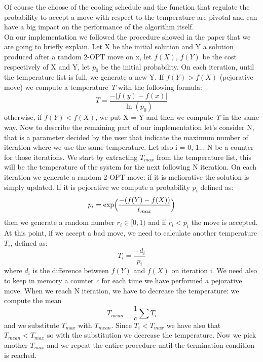 \noindent Of course the choose of the cooling schedule and the function that regulate the probability to accept a move with respect to the temperature are pivotal and can have a big impact on the performance of the algorithm itself. \\
On our implementation we followed the procedure showed in the paper \cite{simAn} that we are going to briefly explain.
Let X be the initial solution and Y a solution produced after a random 2-OPT move on x, let $f(X)$, $f(Y)$ be the cost respectively of X and Y, let $p_0$ be the initial probability. On each iteration, until the temperature list is full, we generate a new Y. If $f(Y) > f(X)$ (pejorative move) we compute a temperature \textit{T} with the following formula:
\begin{equation*}
T = \frac{-\vert f(y) - f(x) \vert}{\ln{(p_0)}}
\end{equation*}
otherwise, if $f(Y) < f(X)$, we put X = Y and then we compute \textit{T} in the same way.
Now to describe the remaining part of our implementation let's consider N, that is a parameter decided by the user that indicate the maximum number of iteration where we use the same temperature. Let also i = 0, 1... N be a counter for those iterations. We start by extracting $T_{max}$ from the temperature list, this will be the temperature of the system for the next following N iteration. On each iteration we generate a random 2-OPT move: if it is meliorative the solution is simply updated. If it is pejorative we compute a probability $p_i$ defined as:
\begin{equation*}
p_i = \exp \Bigl( \frac{-(f(Y)-f(X))}{t_{max}} \Bigr)
\end{equation*}
then we generate a random number $r_i \in [0, 1)$ and if $r_i < p_i$ the move is accepted.
At this point, if we accept a bad move, we need to calculate another temperature $T_i$, defined as:
\begin{equation*}
T_i = \frac{-d_i}{p_i}
\end{equation*} 
where $d_i$ is the difference between $f(Y)$ and $f(X)$ on iteration i. We need also to keep in memory a counter \textit{c} for each time we have performed a pejorative move. When we reach N iteration, we have to decrease the temperature: we compute the mean
\begin{equation*}
T_{mean} = \frac{1}{c} \sum T_i
\end{equation*}
and we substitute $T_{max}$ with $T_{mean}$. Since $T_i < T_{max}$ we have also that $T_{mean} < T_{max}$ so with the substitution we decrease the temperature. Now we pick another $T_{max}$ and we repeat the entire procedure until the termination condition is reached.




